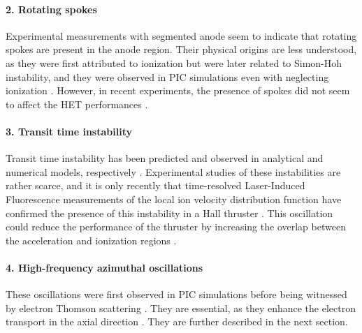   \paragraph{2. Rotating spokes\\}
  Experimental measurements with segmented anode \citep{ellison2012,mcdonald2011} seem to indicate that rotating spokes are present in the anode region.
  Their physical origins are less understood, as they were first attributed to ionization \citep{janes1966} but were later related to Simon-Hoh instability, and they were observed in \ac{PIC} simulations even with neglecting ionization \citep{carlsson2018}.
  However, in recent experiments, the presence of spokes did not seem to affect the \ac{HET} performances \citep{boeuf2018}.

  \paragraph{3. Transit time instability\\}
  Transit time instability has been predicted and observed in analytical and numerical models, respectively \citep{barral2005,boeuf2018}.
  Experimental studies of these instabilities are rather scarce, and it is only recently that time-resolved Laser-Induced Fluorescence measurements of the local ion velocity distribution function have confirmed the presence of this instability in a Hall thruster \citep{vaudolon2015}.
  This oscillation could reduce the performance of the thruster by increasing the overlap between the acceleration and ionization regions \citep{boeuf2018}.

  \paragraph{4. High-frequency azimuthal oscillations\\}
  These oscillations were first observed in \ac{PIC} simulations \citep{adam2004,ducrocq2006,adam2008a,heron2013} before being witnessed by electron Thomson scattering \citep{tsikata2009a,tsikata2009,tsikata2013}.
  They are essential, as they enhance the electron transport in the axial direction \citep{adam2004,lafleur2016a}.
  They are further described in the next section.
